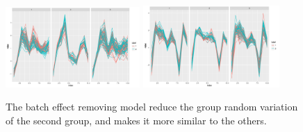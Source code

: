 \documentclass[simplex.tex]{subfiles}
\begin{document}
\begin{figure}[h!]
\begin{cframed}
\centering
\includegraphics[width=0.455\textwidth, clip = true, trim = 0 0 15mm 0]{../../figs/BE_not_removed_data}
\includegraphics[width=0.4635\textwidth, clip = true, trim = 7mm 0 4mm 0]{../../figs/batch_removal_data}
\caption{The batch effect removing model reduce the group random variation of the second group, and makes it more similar to the others.}
\label{fig:arc}
\end{cframed}
\end{figure}
\end{document}
